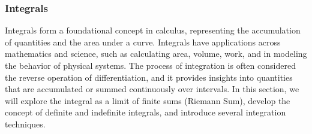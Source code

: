 \exampleline


\subsubsection*{Integrals} 

Integrals form a foundational concept in calculus, representing the accumulation of quantities and the area under a curve. Integrals have applications across mathematics and science, such as calculating area, volume, work, and in modeling the behavior of physical systems. The process of integration is often considered the reverse operation of differentiation, and it provides insights into quantities that are accumulated or summed continuously over intervals. In this section, we will explore the integral as a limit of finite sums (Riemann Sum), develop the concept of definite and indefinite integrals, and introduce several integration techniques. 

